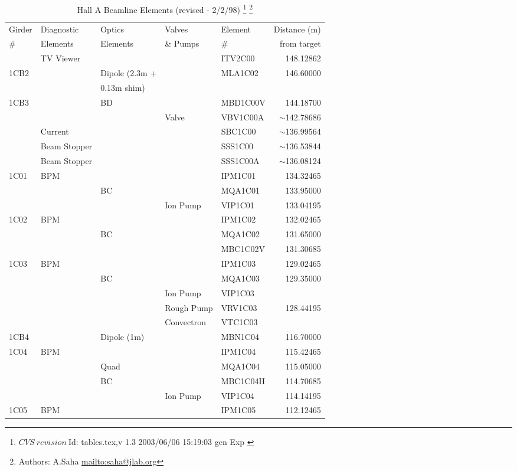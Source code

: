 
\begin{table}[hp]
\caption[Beamline: Hall A Beamline Elements]{Hall A Beamline Elements (revised - 2/2/98)
\footnote{
  $CVS~revision~ $Id: tables.tex,v 1.3 2003/06/06 15:19:03 gen Exp $ $
}
\footnote{Authors: A.Saha \url{mailto:saha@jlab.org}}
}
\label{beam_tab1}


\begin{tabular}{lllllr}
Girder & Diagnostic & Optics & Valves & Element & Distance (m) \\
\# & Elements & Elements & \& Pumps & \# & from target \\ \hline
& TV Viewer &&&ITV2C00 & 148.12862 \\ 
1CB2 & & Dipole (2.3m + & & MLA1C02 & 146.60000 \\
&&0.13m shim) &&& \\
1CB3 && BD && MBD1C00V & 144.18700 \\
&&&Valve & VBV1C00A & $\sim$142.78686 \\
& Current &&& SBC1C00 & $\sim$136.99564 \\
& Beam Stopper &&& SSS1C00 & $\sim$136.53844 \\
& Beam Stopper &&& SSS1C00A & $\sim$136.08124 \\
1C01 & BPM &&& IPM1C01 & 134.32465 \\
&& BC && MQA1C01 & 133.95000 \\
&&& Ion Pump & VIP1C01 & 133.04195 \\
1C02 & BPM &&& IPM1C02 & 132.02465 \\
&& BC && MQA1C02 & 131.65000 \\
&&&& MBC1C02V & 131.30685 \\
1C03 & BPM &&& IPM1C03 & 129.02465 \\
&& BC && MQA1C03 & 129.35000 \\
&&& Ion Pump & VIP1C03 & \\
&&& Rough Pump & VRV1C03 & 128.44195 \\
&&& Convectron & VTC1C03 & \\
1CB4 && Dipole (1m) && MBN1C04 & 116.70000 \\
1C04 & BPM &&& IPM1C04 & 115.42465 \\
&& Quad && MQA1C04 & 115.05000 \\
&& BC && MBC1C04H & 114.70685 \\
&&& Ion Pump & VIP1C04 & 114.14195 \\
1C05 & BPM &&& IPM1C05 & 112.12465 \\

\end{tabular}
\end{table}
